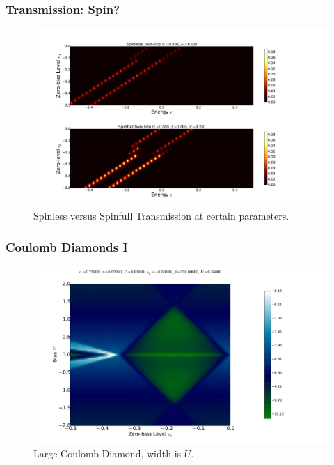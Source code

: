 \begin{frame}
    \frametitle{Transmission: Spin?}
    \vspace{-3mm}
    \begin{figure}[!b] 
        \centering
        \includegraphics[height=.85\textheight, width=\textwidth,clip=true, trim=0cm 0cm 5cm 2cm]{res/transmap_u1_k2.pdf}
        \vspace{-6mm}
        \caption{Spinless versus Spinfull Transmission at certain parameters.}
    \end{figure} 
\end{frame}
\begin{frame}
    \frametitle{Coulomb Diamonds I}
    \vspace{-3mm}
    \begin{figure}[!b] 
        \centering
        \includegraphics[height=.85\textheight, width=\textwidth]{res/current_map_diamond_alpha_075.pdf}
        \vspace{-6mm}
        \caption{Large Coulomb Diamond, width is $U$.}
    \end{figure} 
\end{frame}
